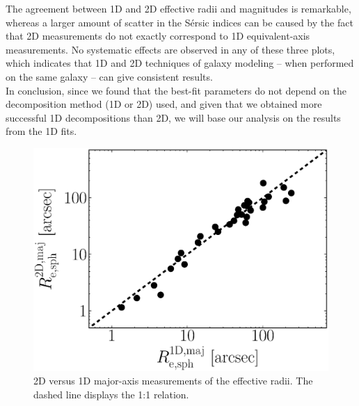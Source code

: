 \documentclass[preprint2]{emulateapj}
\begin{document}
The agreement between 1D and 2D effective radii and magnitudes is remarkable, 
whereas a larger amount of scatter in the S\'ersic indices can be caused by the fact that 
2D measurements do not exactly correspond to 1D equivalent-axis measurements. 
No systematic effects are observed in any of these three plots, 
which indicates that 1D and 2D techniques of galaxy modeling -- when performed on the same galaxy -- 
can give consistent results. \\
In conclusion, since we found that the best-fit parameters do not depend on the decomposition method (1D or 2D) used, 
and given that we obtained more successful 1D decompositions than 2D, 
we will base our analysis on the results from the 1D fits.


\begin{figure}[h]
\begin{center}
\includegraphics[width=\columnwidth]{images/comparison_r_e.eps} 
\caption{2D versus 1D major-axis measurements of the effective radii. 
The dashed line displays the 1:1 relation.}
\label{fig:re1d2d}
\end{center}
\end{figure}
\end{document}
